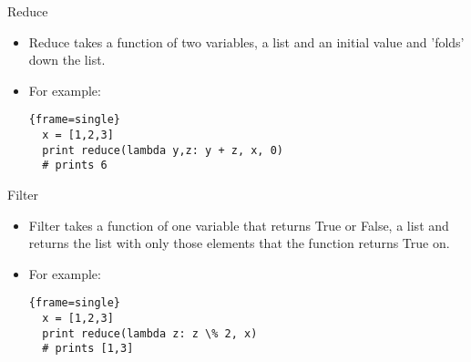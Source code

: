 \documentclass{beamer}
\begin{document}
\begin{frame}[fragile]{Reduce}
	\begin{itemize}
	\item {Reduce takes a function of two variables, a list and an initial value and 'folds' down the list.
	} 
	\pause
	\item{For example:
  \begin{block}{}
  \begin{lstlisting}{frame=single}
  x = [1,2,3]
  print reduce(lambda y,z: y + z, x, 0) 
  # prints 6
  \end{lstlisting}
\end{block}
}
	\end{itemize}
\end{frame}
\begin{frame}[fragile]{Filter}
	\begin{itemize}
	\item {Filter takes a function of one variable that returns True or False, a list and returns the list with only 
	those elements that the function returns True on.
	} 
	\pause
	\item{For example:
  \begin{block}{}
  \begin{lstlisting}{frame=single}
  x = [1,2,3]
  print reduce(lambda z: z \% 2, x) 
  # prints [1,3]
  \end{lstlisting}
\end{block}
}
	\end{itemize}
\end{frame}
\end{document}
